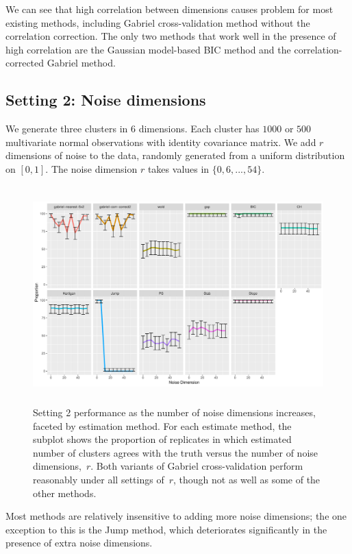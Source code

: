 \documentclass[12pt]{article}
\begin{document}
We can see that high correlation between dimensions causes problem for most
existing methods, including Gabriel cross-validation method without the
correlation correction.  The only two methods that work well in the presence
of high correlation are the Gaussian model-based BIC method
\citep{fraley2002model} and the correlation-corrected Gabriel method. 


\subsection{Setting 2: Noise dimensions}

We generate three clusters in $6$ dimensions. Each cluster has $1000$ or $500$
multivariate normal observations with identity covariance matrix.
We add $r$ dimensions of noise to the data, randomly generated from a uniform
distribution on $[0,1]$. The noise dimension $r$ takes values in
$\{0,6,...,54\}$. 
	
\begin{figure}[H]
\centering
\includegraphics[width=5.5in, height=3.3in]{main_code/demo/bench/setting2/Facet.pdf}
\caption{Setting 2 performance as the number of noise dimensions increases,
    faceted by estimation method. For each estimate method, the subplot shows the proportion of
    replicates in which estimated number of clusters agrees with the truth
    versus the number of noise dimensions,~$r$. Both variants of Gabriel
    cross-validation perform reasonably under all settings of~$r$, though
    not as well as some of the other methods.}
\label{fig:setting2}
\end{figure}

Most methods are relatively insensitive to adding more noise dimensions; the
one exception to this is the Jump method, which deteriorates significantly in
the presence of extra noise dimensions.
\end{document}
